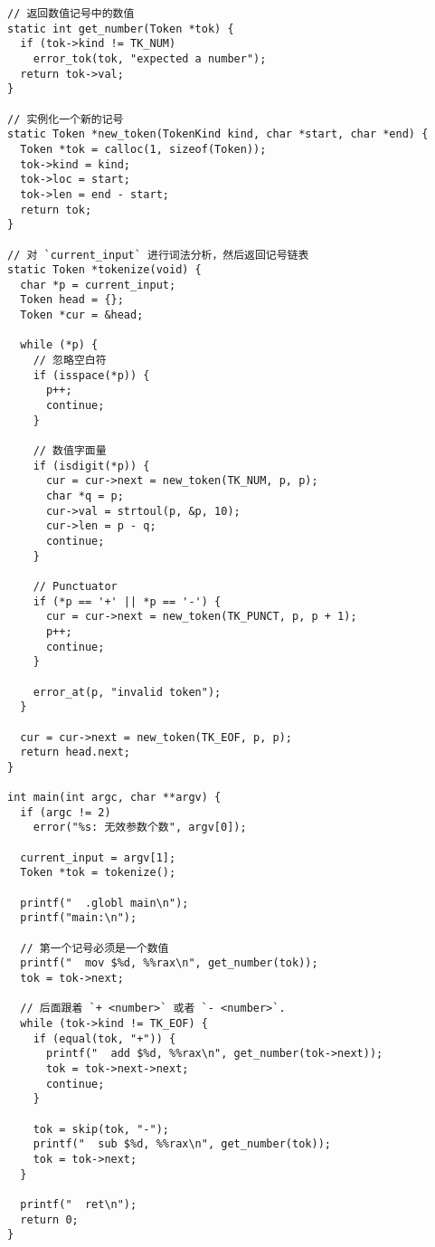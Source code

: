 \documentclass[cn,10pt,math=newtx,citestyle=gb7714-2015,bibstyle=gb7714-2015]{elegantbook}
\begin{document}
\begin{verbatim}
// 返回数值记号中的数值
static int get_number(Token *tok) {
  if (tok->kind != TK_NUM)
    error_tok(tok, "expected a number");
  return tok->val;
}

// 实例化一个新的记号
static Token *new_token(TokenKind kind, char *start, char *end) {
  Token *tok = calloc(1, sizeof(Token));
  tok->kind = kind;
  tok->loc = start;
  tok->len = end - start;
  return tok;
}

// 对 `current_input` 进行词法分析，然后返回记号链表
static Token *tokenize(void) {
  char *p = current_input;
  Token head = {};
  Token *cur = &head;

  while (*p) {
    // 忽略空白符
    if (isspace(*p)) {
      p++;
      continue;
    }

    // 数值字面量
    if (isdigit(*p)) {
      cur = cur->next = new_token(TK_NUM, p, p);
      char *q = p;
      cur->val = strtoul(p, &p, 10);
      cur->len = p - q;
      continue;
    }

    // Punctuator
    if (*p == '+' || *p == '-') {
      cur = cur->next = new_token(TK_PUNCT, p, p + 1);
      p++;
      continue;
    }

    error_at(p, "invalid token");
  }

  cur = cur->next = new_token(TK_EOF, p, p);
  return head.next;
}

int main(int argc, char **argv) {
  if (argc != 2)
    error("%s: 无效参数个数", argv[0]);

  current_input = argv[1];
  Token *tok = tokenize();

  printf("  .globl main\n");
  printf("main:\n");

  // 第一个记号必须是一个数值
  printf("  mov $%d, %%rax\n", get_number(tok));
  tok = tok->next;

  // 后面跟着 `+ <number>` 或者 `- <number>`.
  while (tok->kind != TK_EOF) {
    if (equal(tok, "+")) {
      printf("  add $%d, %%rax\n", get_number(tok->next));
      tok = tok->next->next;
      continue;
    }

    tok = skip(tok, "-");
    printf("  sub $%d, %%rax\n", get_number(tok));
    tok = tok->next;
  }

  printf("  ret\n");
  return 0;
}
\end{verbatim}
\end{document}
